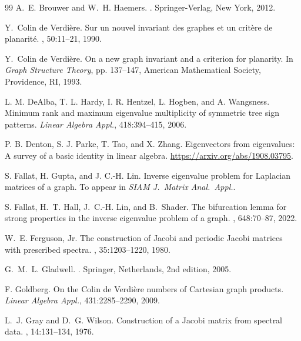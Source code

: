 \documentclass{article}
\theoremstyle{definition}
\begin{document}
\begin{thebibliography}{99}
A.~E. Brouwer and W.~H. Haemers.
.
\newblock Springer-Verlag, New York, 2012.

Y.~Colin de Verdi\`ere.
\newblock Sur un nouvel invariant des graphes et un crit\`ere de planarit\'e.
, 50:11--21, 1990.

Y.~Colin de Verdi\`ere.
\newblock On a new graph invariant and a criterion for planarity.
\newblock In {\it Graph Structure Theory}, pp. 137--147, American Mathematical
  Society, Providence, RI, 1993.

L. M. DeAlba, T. L. Hardy, I. R. Hentzel, L. Hogben, and A. Wangsness. 
\newblock Minimum rank and maximum eigenvalue multiplicity of symmetric tree sign patterns.
\newblock  \emph{Linear Algebra Appl.}, 418:394--415, 2006. 

P. B. Denton, S. J. Parke, T. Tao, and X. Zhang.
\newblock Eigenvectors from eigenvalues: A survey of a basic identity in linear algebra.
\newblock \url{https://arxiv.org/abs/1908.03795}.

S. Fallat, H. Gupta, and J. C.-H. Lin.
\newblock Inverse eigenvalue problem for Laplacian matrices of a graph.
\newblock To appear in {\em SIAM J.\ Matrix Anal.\ Appl.}.

S. Fallat, H.~T. Hall, J.~C.-H. Lin, and B.~Shader.
\newblock The bifurcation lemma for strong properties in the inverse eigenvalue
  problem of a graph.
, 648:70--87, 2022.

W.~E. Ferguson, Jr.
\newblock The construction of {J}acobi and periodic {J}acobi matrices with prescribed spectra.
, 35:1203--1220, 1980.

G.~M.~L. Gladwell.
.
\newblock Springer, Netherlands, 2nd edition, 2005.

F. Goldberg.
\newblock On the Colin de Verdière numbers of Cartesian graph products.
\newblock \emph{Linear Algebra Appl.}, 431:2285--2290, 2009. 

L.~J. Gray and D.~G. Wilson.
\newblock Construction of a {J}acobi matrix from spectral data.
, 14:131--134, 1976.


\end{thebibliography}
\end{document}
